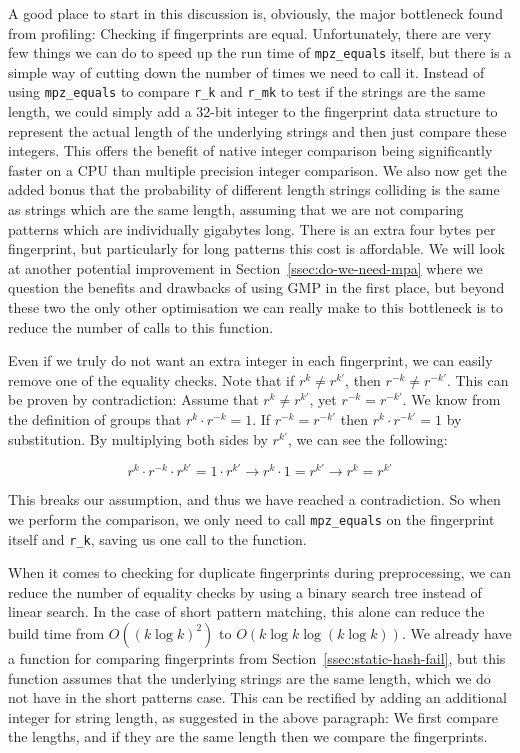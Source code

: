 \documentclass[ %
                    author={Dominic Joseph Moylett},
                    degree={MEng},
                     title={Dictionary Matching with Fingerprints},
                  subtitle={An Empirical Analysis},
                      type={research},
                      year={2015} ]{dissertation}
\begin{document}
A good place to start in this discussion is, obviously, the major bottleneck found from profiling: Checking if fingerprints are equal. Unfortunately, there are very few things we can do to speed up the run time of \texttt{mpz\_equals} itself, but there is a simple way of cutting down the number of times we need to call it. Instead of using \texttt{mpz\_equals} to compare \texttt{r\_k} and \texttt{r\_mk} to test if the strings are the same length, we could simply add a 32-bit integer to the fingerprint data structure to represent the actual length of the underlying strings and then just compare these integers. This offers the benefit of native integer comparison being significantly faster on a CPU than multiple precision integer comparison. We also now get the added bonus that the probability of different length strings colliding is the same as strings which are the same length, assuming that we are not comparing patterns which are individually gigabytes long. There is an extra four bytes per fingerprint, but particularly for long patterns this cost is affordable. We will look at another potential improvement in Section~\ref{ssec:do-we-need-mpa} where we question the benefits and drawbacks of using GMP in the first place, but beyond these two the only other optimisation we can really make to this bottleneck is to reduce the number of calls to this function.

Even if we truly do not want an extra integer in each fingerprint, we can easily remove one of the equality checks. Note that if $r^k \neq r^{k'}$, then $r^{-k} \neq r^{-k'}$. This can be proven by contradiction: Assume that $r^k \neq r^{k'}$, yet $r^{-k} = r^{-k'}$. We know from the definition of groups \cite{katz:inverse-groups} that $r^k \cdot r^{-k} = 1$. If $r^{-k} = r^{-k'}$ then $r^k \cdot r^{-k'} = 1$ by substitution. By multiplying both sides by $r^{k'}$, we can see the following:

$$r^k \cdot r^{-k} \cdot r^{k'} = 1 \cdot r^{k'} \rightarrow r^k \cdot 1 = r^{k'} \rightarrow r^k = r^{k'}$$

This breaks our assumption, and thus we have reached a contradiction. So when we perform the comparison, we only need to call \texttt{mpz\_equals} on the fingerprint itself and \texttt{r\_k}, saving us one call to the function.

When it comes to checking for duplicate fingerprints during preprocessing, we can reduce the number of equality checks by using a binary search tree instead of linear search. In the case of short pattern matching, this alone can reduce the build time from $O((k\log k)^2)$ to $O(k\log k\log(k\log k))$. We already have a function for comparing fingerprints from Section~\ref{ssec:static-hash-fail}, but this function assumes that the underlying strings are the same length, which we do not have in the short patterns case. This can be rectified by adding an additional integer for string length, as suggested in the above paragraph: We first compare the lengths, and if they are the same length then we compare the fingerprints.
\end{document}
